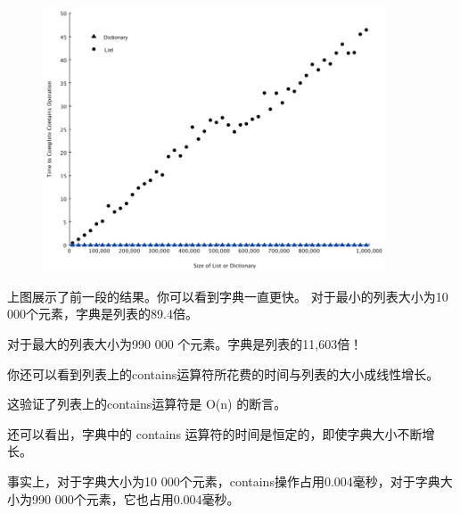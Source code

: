 \begin{frame}[fragile]\ft{\subsecname}

 

  \begin{figure}
    \centering
    \includegraphics[width=4in]{images/dict_figure.png}
  \end{figure}

\end{frame}        


\begin{frame}[fragile]\ft{\subsecname}


上图展示了前一段的结果。你可以看到字典一直更快。 对于最小的列表大小为10 000个元素，字典是列表的89.4倍。

对于最大的列表大小为990 000 个元素。字典是列表的11,603倍！

你还可以看到列表上的contains运算符所花费的时间与列表的大小成线性增长。

这验证了列表上的contains运算符是 O(n) 的断言。

还可以看出，字典中的 contains 运算符的时间是恒定的，即使字典大小不断增长。


事实上，对于字典大小为10 000个元素，contains操作占用0.004毫秒，对于字典大小为990 000个元素，它也占用0.004毫秒。
\end{frame}